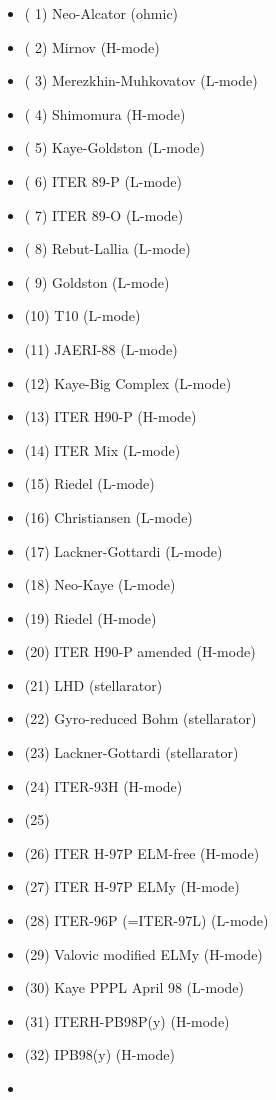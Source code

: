 \documentclass[
]{article}
\providecommand{\tightlist}{%
  \setlength{\itemsep}{0pt}\setlength{\parskip}{0pt}}
\begin{document}
\begin{itemize}
  \begin{itemize}
  \tightlist
  \item
    ( 1) Neo-Alcator (ohmic)
  \item
    ( 2) Mirnov (H-mode)
  \item
    ( 3) Merezkhin-Muhkovatov (L-mode)
  \item
    ( 4) Shimomura (H-mode)
  \item
    ( 5) Kaye-Goldston (L-mode)
  \item
    ( 6) ITER 89-P (L-mode)
  \item
    ( 7) ITER 89-O (L-mode)
  \item
    ( 8) Rebut-Lallia (L-mode)
  \item
    ( 9) Goldston (L-mode)
  \item
    (10) T10 (L-mode)
  \item
    (11) JAERI-88 (L-mode)
  \item
    (12) Kaye-Big Complex (L-mode)
  \item
    (13) ITER H90-P (H-mode)
  \item
    (14) ITER Mix (L-mode)
  \item
    (15) Riedel (L-mode)
  \item
    (16) Christiansen (L-mode)
  \item
    (17) Lackner-Gottardi (L-mode)
  \item
    (18) Neo-Kaye (L-mode)
  \item
    (19) Riedel (H-mode)
  \item
    (20) ITER H90-P amended (H-mode)
  \item
    (21) LHD (stellarator)
  \item
    (22) Gyro-reduced Bohm (stellarator)
  \item
    (23) Lackner-Gottardi (stellarator)
  \item
    (24) ITER-93H (H-mode)
  \item
    (25)
  \item
    (26) ITER H-97P ELM-free (H-mode)
  \item
    (27) ITER H-97P ELMy (H-mode)
  \item
    (28) ITER-96P (=ITER-97L) (L-mode)
  \item
    (29) Valovic modified ELMy (H-mode)
  \item
    (30) Kaye PPPL April 98 (L-mode)
  \item
    (31) ITERH-PB98P(y) (H-mode)
  \item
    (32) IPB98(y) (H-mode)
  \item

\end{itemize}
\end{itemize}
\end{document}
